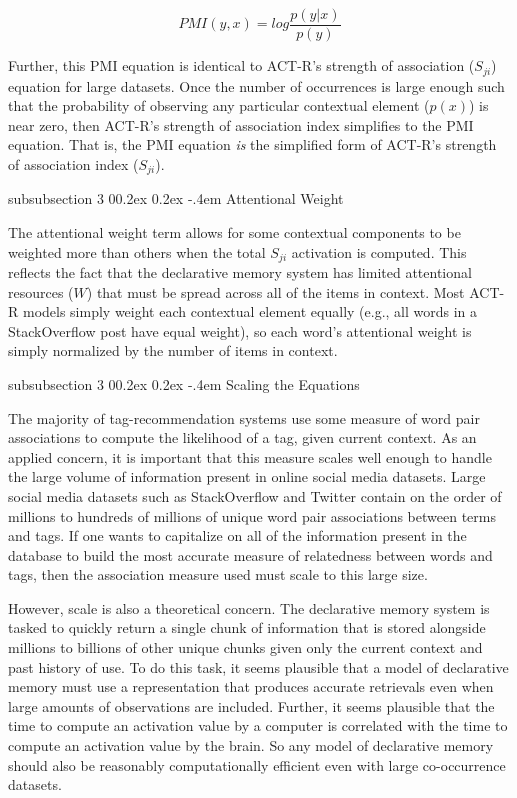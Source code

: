 \documentclass[man,floatsintext,donotrepeattitle]{apa6}
\makeatletter
\renewcommand{\subsubsection}{%
  \@startsection
  {subsubsection}%
  {3}%
  {\parindent}%
  {0\baselineskip \@plus 0.2ex \@minus 0.2ex}%
  {-.4em}%
  {\normalfont\normalsize\bfseries\addperi}}
\makeatother
\begin{document}
\begin{equation}
  \label{eqPMI}
  \mathit{PMI}(y,x) = log \frac{p(y|x)}{p(y)}
\end{equation}

Further, this PMI equation is identical to ACT-R's strength of association ($S_{ji}$) equation for large datasets.
Once the number of occurrences is large enough such that the probability of observing any particular contextual element ($p(x)$) is near zero, then ACT-R's strength of association index simplifies to the PMI equation.
That is, the PMI equation \emph{is} the simplified form of ACT-R's strength of association index ($S_{ji}$).

\subsubsection{Attentional Weight}

The attentional weight term allows for some contextual components to be weighted more than others when the total $S_{ji}$ activation is computed.
This reflects the fact that the declarative memory system has limited attentional resources ($W$) that must be spread across all of the items in context.
Most ACT-R models simply weight each contextual element equally (e.g., all words in a StackOverflow post have equal weight), so each word's attentional weight is simply normalized by the number of items in context.

\subsubsection{Scaling the Equations}

The majority of tag-recommendation systems use some measure of word pair associations to compute the likelihood of a tag, given current context.
As an applied concern, it is important that this measure scales well enough to handle the large volume of information present in online social media datasets.
Large social media datasets such as StackOverflow and Twitter contain on the order of millions to hundreds of millions of unique word pair associations between terms and tags.
If one wants to capitalize on all of the information present in the database to build the most accurate measure of relatedness between words and tags, then the association measure used must scale to this large size.

However, scale is also a theoretical concern.
The declarative memory system is tasked to quickly return a single chunk of information that is stored alongside millions to billions of other unique chunks given only the current context and past history of use.
To do this task, it seems plausible that a model of declarative memory must use a representation that produces accurate retrievals even when large amounts of observations are included.
Further, it seems plausible that the time to compute an activation value by a computer is correlated with the time to compute an activation value by the brain.
So any model of declarative memory should also be reasonably computationally efficient even with large co-occurrence datasets.
\end{document}
